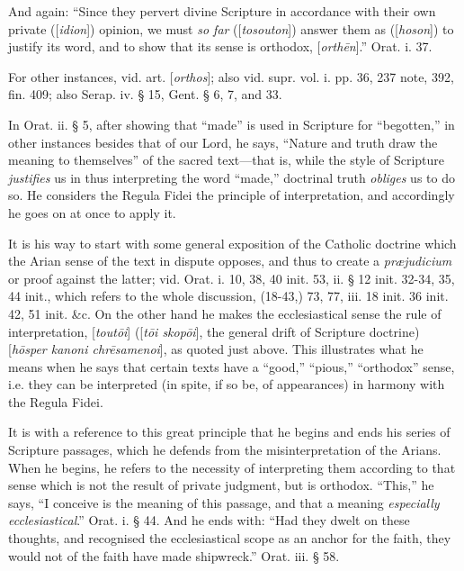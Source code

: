 And
again: ``Since they pervert divine Scripture in accordance with their
own private ([\emph{idion}]) opinion, we must \emph{so far} ([\emph{tosouton}])
answer them as ([\emph{hoson}]) to justify its word, and to show that
its sense is orthodox, [\emph{orth\={e}n}].'' Orat. i. 37.

For
other instances, vid. art. [\emph{orthos}]; also vid. supr. vol. i.
pp. 36, 237 note, 392, fin. 409; also Serap. iv. § 15, Gent. § 6, 7,
and 33.

In
Orat. ii. § 5, after showing that ``made'' is used in Scripture for ``begotten,''
in other instances besides that of our Lord, he says, ``Nature and
truth draw the meaning to themselves'' of the sacred text—that
is, while the style of Scripture \emph{justifies} us in thus
interpreting the word ``made,'' doctrinal truth \emph{obliges} us to do
so. He considers the Regula Fidei the principle of interpretation, and
accordingly he goes on at once to apply it.

It
is his way to start with some general exposition of the Catholic
doctrine which the Arian sense of the text in dispute opposes, and
thus to create a \emph{præjudicium} or proof against the latter; vid.
Orat. i. 10, 38, 40 init. 53, ii. § 12 init. 32-34, 35, 44 init.,
which refers to the whole discussion, (18-43,) 73, 77, iii. 18 init.
36 init. 42, 51 init. \&c. On the other hand he makes the
ecclesiastical sense the rule of interpretation, [\emph{tout\={o}i}]
([\emph{t\={o}i skop\={o}i}], the general drift of Scripture
doctrine) [\emph{h\={o}sper kanoni chr\={e}samenoi}], as quoted
just above. This illustrates what he means when he says that certain
texts have a ``good,'' ``pious,'' ``orthodox'' sense, i.e. they can be
interpreted (in spite, if so be, of appearances) in harmony with the
Regula Fidei.

It
is with a reference to this great principle that he begins and ends
his series of Scripture passages, which he defends from the
misinterpretation of the Arians. When he begins, he refers to the
necessity of interpreting them according to that sense which is not
the result of private judgment, but is orthodox. ``This,'' he says, ``I
conceive is the meaning of this passage, and that a meaning \emph{especially
ecclesiastical}.'' Orat. i. § 44. And he ends with: ``Had they dwelt
on these thoughts, and recognised the ecclesiastical scope as an anchor for the faith, they would not of the faith have made shipwreck.''
Orat. iii. § 58.

